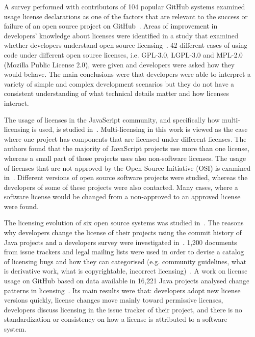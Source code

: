 \documentclass{elsarticle}
\begin{document}
A survey performed with contributors of 104 popular GitHub systems examined usage license declarations as one of the factors that are relevant to the success or failure of an open source project on GitHub~\cite{coelho2017modern}. Areas of improvement in developers' knowledge about licenses were identified in a study that examined whether developers understand open source licensing~\cite{almeida2017software}. 42 different cases of using code under different open source licenses, i.e. GPL-3.0, LGPL-3.0 and MPL-2.0 (Mozilla Public License 2.0), were given and developers were asked how they would behave. The main conclusions were that developers were able to interpret a variety of simple and complex development scenarios but they do not have a consistent understanding of what technical details matter and how licenses interact. 

The usage of licenses in the JavaScript community, and specifically how multi-licensing is used, is studied in~\cite{moraes2021one}. Multi-licensing in this work is viewed as the case where one project has components that are licensed under different licenses. The authors found that the majority of JavaScript projects use more than one license, whereas a small part of those projects uses also non-software licenses. The usage of licenses that are not approved by the Open Source Initiative (OSI) is examined in~\cite{meloca2018understanding}. Different versions of open source software projects were studied, whereas the developers of some of these projects were also contacted. Many cases, where a software license would be changed from a non-approved to an approved license were found. 

The licensing evolution of six open source systems was studied in~\cite{di2010exploratory}. The reasons why developers change the license of their projects using the commit history of Java projects and a developers survey were investigated in~\cite{vendome2015and}. 1,200 documents from issue trackers and legal mailing lists were used in order to devise a catalog of licensing bugs and how they can categorised (e.g. community guidelines, what is derivative work, what is copyrightable, incorrect licensing)~\cite{vendome2018distribute}. A work on license usage on GitHub based on data available in 16,221 Java projects analysed change patterns in licensing~\cite{vendome2017license}. Its main results were that: developers adopt new license versions quickly, license changes move mainly toward permissive licenses, developers discuss licensing in the issue tracker of their project, and there is no standardization or consistency on how a license is attributed to a software system.
 
\end{document}
